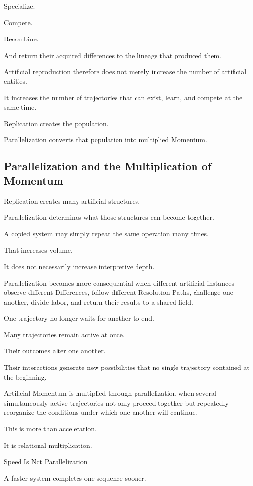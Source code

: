 Specialize.

Compete.

Recombine.

And return their acquired differences to the lineage that produced them.

Artificial reproduction therefore does not merely increase the number of artificial entities.

It increases the number of trajectories that can exist, learn, and compete at the same time.

Replication creates the population.

Parallelization converts that population into multiplied Momentum.

\subsection*{\textbf{Parallelization and the Multiplication of Momentum}} 

Replication creates many artificial structures.

Parallelization determines what those structures can become together.

A copied system may simply repeat the same operation many times.

That increases volume.

It does not necessarily increase interpretive depth.

Parallelization becomes more consequential when different artificial instances observe different Differences, follow different Resolution Paths, challenge one another, divide labor, and return their results to a shared field.

One trajectory no longer waits for another to end.

Many trajectories remain active at once.

Their outcomes alter one another.

Their interactions generate new possibilities that no single trajectory contained at the beginning.

Artificial Momentum is multiplied through parallelization when several simultaneously active trajectories not only proceed together but repeatedly reorganize the conditions under which one another will continue.

This is more than acceleration.

It is relational multiplication.

Speed Is Not Parallelization

A faster system completes one sequence sooner.


